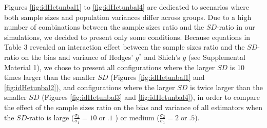 \documentclass[
  english,
  man,floatsintext]{apa6}
\begin{document}
Figures \ref{fig:idHetunbal1} to \ref{fig:idHetunbal4} are dedicated to scenarios where both sample sizes and population variances differ across groups. Due to a high number of combinations between the sample sizes ratio and the \(SD\)-ratio in our simulations, we decided to present only some conditions. Because equations in Table 3 revealed an interaction effect between the sample sizes ratio and the \(SD\)-ratio on the bias and variance of Hedges' \(g^*\) and Shieh's \(g\) (see Supplemental Material 1), we chose to present all configurations where the larger \(SD\) is 10 times larger than the smaller \(SD\) (Figures \ref{fig:idHetunbal1} and \ref{fig:idHetunbal2}), and configurations where the larger \(SD\) is twice larger than the smaller \(SD\) (Figures \ref{fig:idHetunbal3} and \ref{fig:idHetunbal4}), in order to compare the effect of the sample sizes ratio on the bias and variance of all estimators when the \(SD\)-ratio is large (\(\frac{\sigma_2}{\sigma_1}=10 \; \mathrm{or} \; .1\) ) or medium (\(\frac{\sigma_2}{\sigma_1}=2 \; \mathrm{or} \; .5\)).
\end{document}

